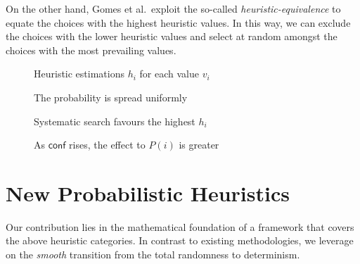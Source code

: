 \documentclass{ws-ijait}
\begin{document}
On the other hand, Gomes et al.\ exploit the so-called \emph{heuristic-equivalence} to equate the choices with the highest heuristic values. In this way, we can exclude the choices with the lower heuristic values and select at random amongst the choices with the most prevailing values.\cite{equivalence}

\begin{figure}
\centering

\caption{Heuristic estimations $h_i$ for each value $v_i$\label{heuristics}}
\end{figure}

\begin{figure}
\centering

\caption{The probability is spread uniformly\label{uniform}}
\end{figure}

\begin{figure}
\centering

\caption{Systematic search favours the highest $h_i$\label{systematic}}
\end{figure}

\begin{figure}
\centering

\caption{As $\mathsf{conf}$ rises, the effect to $P(i)$ is greater\label{conf}}
\end{figure}


\section{New Probabilistic Heuristics}

Our contribution lies in the mathematical foundation of a framework that covers the above heuristic categories. In contrast to existing methodologies, we leverage on the \emph{smooth} transition from the total randomness to determinism.
\end{document}
